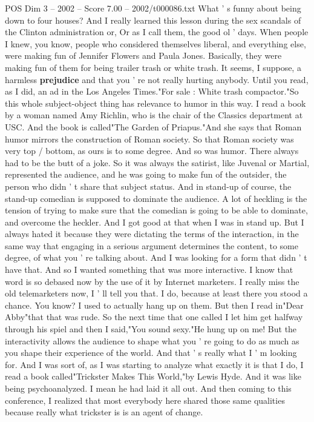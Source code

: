 \begin{textsample}{POS Dim 3 – 2002 – Score 7.00 – 2002/t000086.txt}
What ' s funny about being down to four houses?
And I really learned this lesson during the sex scandals of the Clinton administration or, Or as I call them, the good ol ' days.
When people I knew, you know, people who considered themselves liberal, and everything else, were making fun of Jennifer Flowers and Paula Jones.
Basically, they were making fun of them for being trailer trash or white trash.
It seems, I suppose, a harmless \textbf{prejudice} and that you ' re not really hurting anybody.
Until you read, as I did, an ad in the Los Angeles Times."For sale : White trash compactor."So this whole subject-object thing has relevance to humor in this way.
I read a book by a woman named Amy Richlin, who is the chair of the Classics department at USC.
And the book is called"The Garden of Priapus."And she says that Roman humor mirrors the construction of Roman society.
So that Roman society was very top / bottom, as ours is to some degree.
And so was humor.
There always had to be the butt of a joke.
So it was always the satirist, like Juvenal or Martial, represented the audience, and he was going to make fun of the outsider, the person who didn ' t share that subject status.
And in stand-up of course, the stand-up comedian is supposed to dominate the audience.
A lot of heckling is the tension of trying to make sure that the comedian is going to be able to dominate, and overcome the heckler.
And I got good at that when I was in stand up.
But I always hated it because they were dictating the terms of the interaction, in the same way that engaging in a serious argument determines the content, to some degree, of what you ' re talking about.
And I was looking for a form that didn ' t have that.
And so I wanted something that was more interactive.
I know that word is so debased now by the use of it by Internet marketers.
I really miss the old telemarketers now, I ' ll tell you that.
I do, because at least there you stood a chance.
You know?
I used to actually hang up on them.
But then I read in"Dear Abby"that that was rude.
So the next time that one called I let him get halfway through his spiel and then I said,"You sound sexy."He hung up on me!
But the interactivity allows the audience to shape what you ' re going to do as much as you shape their experience of the world.
And that ' s really what I ' m looking for.
And I was sort of, as I was starting to analyze what exactly it is that I do, I read a book called"Trickster Makes This World,"by Lewis Hyde.
And it was like being psychoanalyzed.
I mean he had laid it all out.
And then coming to this conference, I realized that most everybody here shared those same qualities because really what trickster is is an agent of change.

\end{textsample}
